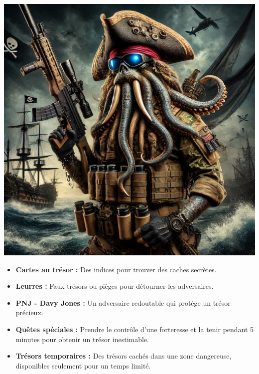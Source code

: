\documentclass{pirategame}
\begin{document}
\begin{minipage}[t]{0.28\textwidth}
  \textwidth %
  \vspace{0em}
  \includegraphics[width=\linewidth]{img/davy-jones.png} %
\end{minipage}
\hfill
\begin{minipage}[t]{0.7\textwidth}
  \begin{itemize}[series=extension]
      \item \textbf{Cartes au trésor :} Des indices pour trouver des caches secrètes.
      \item \textbf{Leurres :} Faux trésors ou pièges pour détourner les adversaires.
      \item \textbf{PNJ - Davy Jones :} Un adversaire redoutable qui protège un trésor précieux.
      \item \textbf{Quêtes spéciales :} Prendre le contrôle d’une forteresse et la tenir pendant 5 minutes pour obtenir un trésor inestimable.
      \item \textbf{Trésors temporaires :} Des trésors cachés dans une zone dangereuse, disponibles seulement pour un temps limité.
  \end{itemize}
\end{minipage}
\end{document}
